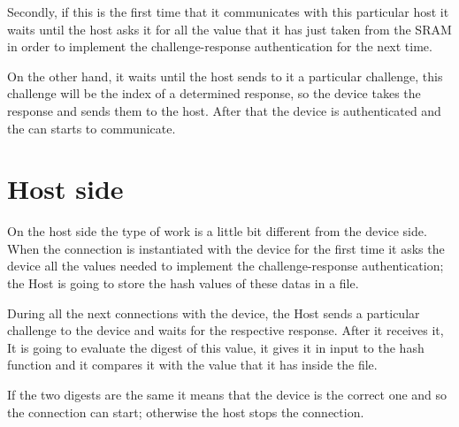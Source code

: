 Secondly, if this is the first time that it communicates with this particular host it waits until the host asks it for all the value that it has just taken from the SRAM in order to implement the challenge-response authentication for the next time.

On the other hand, it waits until the host sends to it a particular challenge, this challenge will be the index of a determined response, so the device takes the response and sends them to the host.
After that the device is authenticated and the can starts to communicate.



\section {Host side} 
On the host side the type of work is a little bit different from the device side.
When the connection is instantiated with the device for the first time it asks the device all the values needed to implement the challenge-response authentication; the Host is going to store the hash values of these datas in a file.

During all the next connections with the device, the Host sends a particular challenge to the device and waits for the respective response.
After it receives it, It is going to evaluate the digest of this value, it gives it in input to the hash function and it compares it with the value that it has inside the file.

If the two digests are the same it means that the device is the correct one and so the connection can start; otherwise the host stops the connection.




